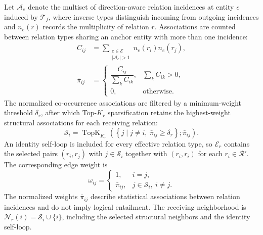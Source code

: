 \documentclass[a4paper,fleqn]{cas-dc}
\begin{document}
Let $\mathcal{A}_e$ denote the multiset of direction-aware relation incidences at entity $e$ induced by $\mathcal{T}_{f}$, where inverse types distinguish incoming from outgoing incidences and $n_e(r)$ records the multiplicity of relation $r$. Associations are counted between relation types sharing an anchor entity with more than one incidence:
\begin{equation}
\begin{aligned}
C_{ij}
&=
\sum_{\substack{e\in\mathcal{E}\\|\mathcal{A}_e|>1}}
n_e(r_i)n_e(r_j),\\
\bar{\pi}_{ij}
&=
\begin{cases}
\dfrac{C_{ij}}{\sum_k C_{ik}},
& \sum_k C_{ik}>0,\\[5pt]
0,
& \text{otherwise}.
\end{cases}
\end{aligned}
\label{eq:relation-structural-prior}
\end{equation}
The normalized co-occurrence associations are filtered by a minimum-weight threshold $\delta_r$, after which Top-$K_r$ sparsification retains the highest-weight structural associations for each receiving relation:
\begin{equation}
\mathcal{S}_{i}
=
\operatorname{TopK}_{K_r}
\left(
\left\{
j\mid j\neq i,\ \bar{\pi}_{ij}\geq\delta_r
\right\};
\bar{\pi}_{ij}
\right).
\label{eq:relation-neighborhood}
\end{equation}
An identity self-loop is included for every effective relation type, so $\mathcal{E}_{r}$ contains the selected pairs $(r_i,r_j)$ with $j\in\mathcal{S}_{i}$ together with $(r_i,r_i)$ for each $r_i\in\mathcal{R}'$. The corresponding edge weight is
\begin{equation}
\omega_{ij}
=
\begin{cases}
1,
& i=j,\\
\bar{\pi}_{ij},
& j\in\mathcal{S}_{i},\ i\neq j.
\end{cases}
\label{eq:relation-edge-weight}
\end{equation}
The normalized weights $\bar{\pi}_{ij}$ describe statistical associations between relation incidences and do not imply logical entailment. The receiving neighborhood is $\mathcal{N}_{r}(i)=\mathcal{S}_{i}\cup\{i\}$, including the selected structural neighbors and the identity self-loop.
\end{document}
